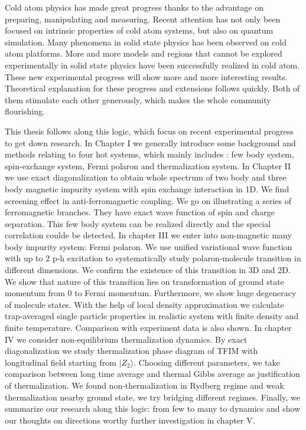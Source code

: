 Cold atom physics has made great progress thanks to the advantage on preparing, manipulating and measuring. Recent attention has not only been focused on intrinsic properties of cold atom systems, but also on quantum simulation. Many phenomena in solid state physics has been observed on cold atom platforms. More and more models and regions that cannot be explored experimentally in solid state physics have been successfully realized in cold atom. These new experimental progress will show more and more interesting results. Theoretical explanation for these progress and extensions follows quickly. Both of them stimulate each other generously, which makes the whole community flourishing.

This thesis follows along this logic, which focus on recent experimental progress to get down research. In Chapter I we generally introduce some background and methods relating to four hot systems, which mainly includes : few body system, spin-exchange system, Fermi polaron and thermalization system. In Chapter II we use exact diagonalization to obtain whole spectrum of two body and three body magnetic impurity system with spin exchange interaction in 1D. We find screening effect in anti-ferromagnetic coupling. We go on illustrating a series of ferromagnetic branches. They have exact wave function of spin and charge separation. This few body system can be realized directly and the special correlation coulde be detected. In chapter III we enter into non-magnetic many body impurity system: Fermi polaron. We use unified variational wave function with up to 2 p-h excitation to systematically study polaron-molecule transition in different dimensions. We confirm the existence of this transition in 3D and 2D. We show that nature of this transition lies on transformation of ground state momentum from 0 to Fermi momentum. Furthermore, we show huge degeneracy of molecule states. With the help of local density approximation we calculate trap-averaged single particle properties in realistic system with finite density and finite temperature. Comparison with experiment data is also shown. In chapter IV we consider non-equilibrium thermalization dynamics. By exact diagonalization we study thermalization phase diagram of TFIM with longitudinal field starting from $|Z_2\rangle$. Choosing different parameters, we take comparison between long time average and thermal Gibbs average as justification of thermalization. We found non-thermalization in Rydberg regime and weak thermalization nearby ground state, we try bridging different regimes. Finally, we summarize our research along this logic: from few to many to dynamics and show our thoughts on directions worthy further investigation in chapter V.


